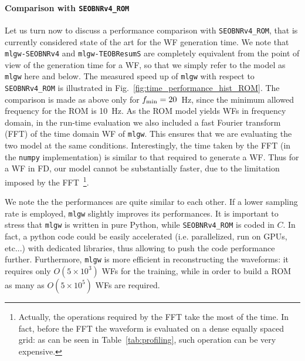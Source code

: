 \paragraph{Comparison with \texttt{SEOBNRv4\_ROM}}
Let us turn now to discuss a performance comparison with \texttt{SEOBNRv4\_ROM}, that
is currently considered state of the art for the WF generation time.
We note that  \texttt{mlgw-SEOBNRv4}  and \texttt{mlgw-TEOBResumS} are completely
equivalent from the point of view of the generation time for a WF,
so that we simply refer to the model as {\tt mlgw} here and below.
The measured speed up of {\tt mlgw} with respect to \texttt{SEOBNRv4\_ROM} 
is illustrated in Fig.~\ref{fig:time_performance_hist_ROM}.
The comparison is made as above only for $f_{\rm min} = 20$~Hz, since the minimum allowed frequency
for the ROM is 10~Hz. As the ROM model yields WFs in frequency domain, 
in the run-time evaluation we also included a fast Fourier transform (FFT) of the time 
domain WF of \texttt{mlgw}.  This ensures that we are evaluating 
the two model at the same conditions.
Interestingly, the time taken by the FFT (in the \texttt{numpy}
implementation) is similar to that required to generate a WF. Thus for
a WF in FD, our model cannot be substantially faster, due to the
limitation imposed by the FFT~\footnote{Actually, the operations required by
the FFT take the most of the time. In fact,  before the FFT the waveform 
is evaluated on a dense equally spaced grid: as can be seen in 
Table~\ref{tab:profiling}, such operation can be very expensive.}.

We note the the performances are quite similar to each other.
If a lower sampling rate is employed, \texttt{mlgw} 
slightly improves its performances. It is important to stress 
that \texttt{mlgw}  is written in pure Python, 
while \texttt{SEOBNRv4\_ROM} is coded in $C$.
In fact, a python code could be easily accelerated (i.e. parallelized, run on GPUs, etc...) 
with dedicated libraries, thus allowing to push the code performance further.
%
Furthermore, \texttt{mlgw} is more efficient in reconstructing 
the waveforms: it requires only $O(5\times 10^3)$ WFs for the training,
while in order to build a ROM as many as $O(5\times 10^5)$ WFs are
required. 

